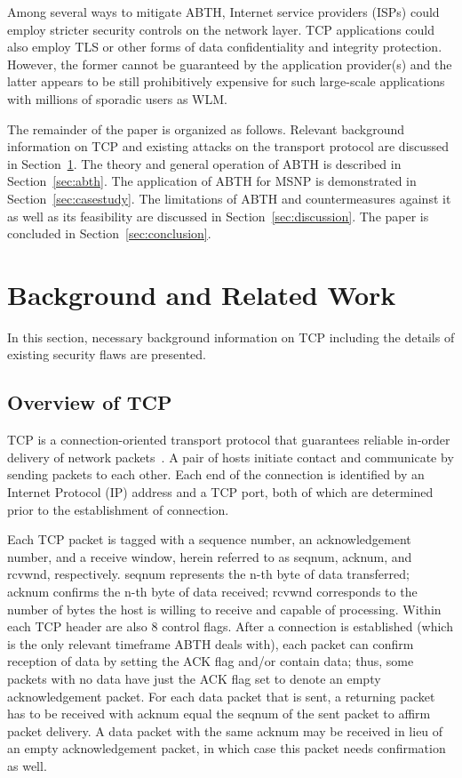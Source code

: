 \documentclass{sig-alternate}
\begin{document}
Among several ways to mitigate ABTH, Internet service providers (ISPs) could employ stricter security controls on the network layer.
TCP applications could also employ TLS or other forms of data confidentiality and integrity protection.
However, the former cannot be guaranteed by the application provider(s) and the latter appears to be still prohibitively expensive for such large-scale applications with millions of sporadic users as WLM.

The remainder of the paper is organized as follows.
Relevant background information on TCP and existing attacks on the transport protocol are discussed in Section~\ref{sec:background}.
The theory and general operation of ABTH is described in Section~\ref{sec:abth}.
The application of ABTH for MSNP is demonstrated in Section~\ref{sec:casestudy}.
The limitations of ABTH and countermeasures against it as well as its feasibility are discussed in Section~\ref{sec:discussion}.
The paper is concluded in Section~\ref{sec:conclusion}.

\section{Background and Related Work}
\label{sec:background}

In this section, necessary background information on TCP including the details of existing security flaws are presented.

\subsection{Overview of TCP}

TCP is a connection-oriented transport protocol that guarantees reliable in-order delivery of network packets~\cite{rfc:tcp}.
A pair of hosts initiate contact and communicate by sending packets to each other.
Each end of the connection is identified by an Internet Protocol (IP) address and a TCP port, both of which are determined prior to the establishment of connection.

Each TCP packet is tagged with a sequence number, an acknowledgement number, and a receive window, herein referred to as seqnum, acknum, and rcvwnd, respectively.
seqnum represents the n-th byte of data transferred; acknum confirms the n-th byte of data received; rcvwnd corresponds to the number of bytes the host is willing to receive and capable of processing.
Within each TCP header are also 8 control flags.
After a connection is established (which is the only relevant timeframe ABTH deals with), each packet can confirm reception of data by setting the ACK flag and/or contain data; thus, some packets with no data have just the ACK flag set to denote an empty acknowledgement packet.
For each data packet that is sent, a returning packet has to be received with acknum equal the seqnum of the sent packet to affirm packet delivery.
A data packet with the same acknum may be received in lieu of an empty acknowledgement packet, in which case this packet needs confirmation as well.
\end{document}
